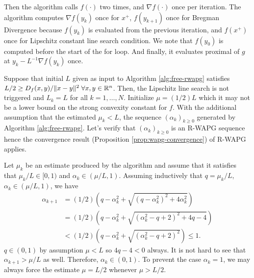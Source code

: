 \documentclass[12pt]{article}
\begin{document}
    Then the algorithm calls $f(\cdot)$ two times, and $\nabla f(\cdot)$ once per iteration.
    The algorithm computes $\nabla f(y_k)$ once for $x^+$, $f(y_{k + 1})$ once for Bregman Divergence because $f(y_{k})$ is evaluated from the previous iteration, and $f(x^+)$ once for Lipschitz constant line search condition.
    We note that $f(y_0)$ is computed before the start of the for loop.
    And finally, it evaluates proximal of $g$ at $y_k - L^{-1}\nabla f(y_k)$ once.
    \par
    Suppose that initial $L$ given as input to Algorithm \ref{alg:free-rwapg} satisfies $L/2 \ge D_f(x, y)/\Vert x - y\Vert^2\;\forall x, y \in \mathbb R^n$.
    Then, the Lipschitz line search is not triggered and $L_k = L$ for all $k = 1, \ldots, N$.
    Initialize $\mu = (1/2)L$ which it may not be a lower bound on the strong convexity constant for $f$.
    With the additional assumption that the estimated $\mu_k < L$, the sequence $(\alpha_k)_{k \ge 0}$ generated by Algorithm \ref{alg:free-rwapg}.
    Let's verify that $(\alpha_k)_{k \ge 0}$ is an R-WAPG sequence hence the convergence result (Proposition \ref{prop:wapg-convergence}) of R-WAPG applies.
    \par
    Let $\mu_k$ be an estimate produced by the algorithm and assume that it satisfies that $\mu_k/ L \in [0, 1)$ and $\alpha_k \in (\mu/L, 1)$.
    Assuming inductively that $q = \mu_k/L$,  $\alpha_k \in (\mu/L, 1)$, we have
    \begin{align*}
        \alpha_{k + 1}
        &=
        (1/2)\left(
            q - \alpha_k^2 + \sqrt{(q - \alpha_k^2)^2 + 4 \alpha_k^2}
        \right)
        \\
        &=
        (1/2)\left(
            q - \alpha_k^2 + \sqrt{
                (\alpha_k^2 - q + 2)^2 + 4q - 4
            }
        \right)
        \\
        &<
        (1/2)\left(
            q - \alpha_k^2 + \sqrt{
                (\alpha_k^2 - q + 2)^2
            }
        \right) \le 1.
    \end{align*}
    $q \in (0, 1)$ by assumption $\mu < L$ so $4q - 4 < 0$ always.
    It is not hard to see that $\alpha_{k + 1} > \mu/L$ as well.
    Therefore, $\alpha_k \in (0, 1)$.
    To prevent the case $\alpha_k = 1$, we may always force the estimate $\mu = L/2$ whenever $\mu > L/2$.
\end{document}
